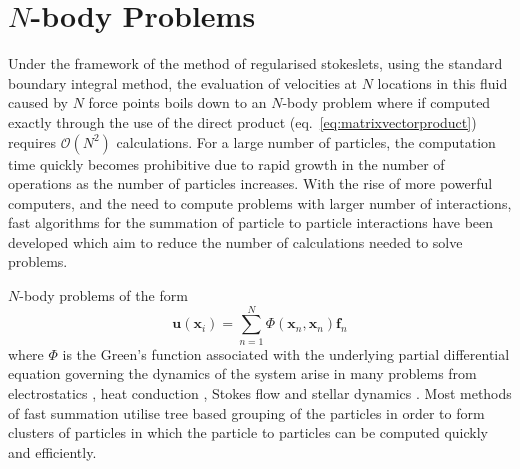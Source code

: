 \FloatBarrier
\section{\texorpdfstring{$N$-body Problems}{N-body Problems}} \label{sec:Nbody}

Under the framework of the method of regularised stokeslets, using the standard boundary integral method, the evaluation of velocities at $N$ locations in this fluid caused by $N$ force points boils down to an $N$-body problem where if computed exactly through the use of the direct product (eq.~\ref{eq:matrixvectorproduct}) requires $\mathcal{O}(N^2)$ calculations. For a large number of particles, the computation time quickly becomes prohibitive due to rapid growth in the number of operations as the number of particles increases. With the rise of more powerful computers, and the need to compute problems with larger number of interactions, fast algorithms for the summation of particle to particle interactions have been developed which aim to reduce the number of calculations needed to solve problems. 

$N$-body problems of the form
\begin{equation*}
    \bm{u}(\bm{x}_i) = \sum_{n=1}^N \Phi(\bm{x}_n,{\bm{x}}_n){\bm{f}}_n
\end{equation*}
where $\Phi$ is the Green's function associated with the underlying partial differential equation governing the dynamics of the system arise in many problems from electrostatics \cite{Beatson,Tornberg2008}, heat conduction \cite{Greengard1990APotentials}, Stokes flow \cite{Cortez2015,Tornberg2008} and stellar dynamics \cite{Dehnen2014ADynamics}. Most methods of fast summation utilise tree based grouping of the particles in order to form clusters of particles in which the particle to particles can be computed quickly and efficiently. 

